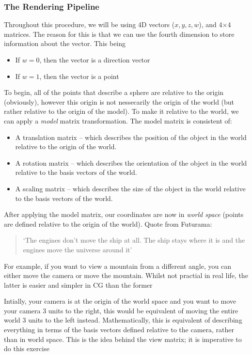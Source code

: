 \documentclass[main.tex]{subfiles}
\begin{document}
\subsubsection*{The Rendering Pipeline}
Throughout this procedure, we will be using 4D vectors ($x, y, z, w$), and 4$\times$4 matrices. The reason for this is that we can use the fourth dimension to store information
about the vector. This being
\begin{itemize}
    \item If $w = 0$, then the vector is a direction vector
    \item If $w = 1$, then the vector is a point
\end{itemize}
To begin, all of the points that describe a sphere are relative to the origin (obviously), however this origin is not nessecarily the origin
of the world (but rather relative to the origin of the model). To make it relative to the world, we can apply a \textit{model} matrix transformation.
The model matrix is consistent of:
\begin{itemize}
    \item A translation matrix -- which describes the position of the object in the world relative to the origin of the world.
    \item A rotation matrix -- which describes the orientation of the object in the world relative to the basis vectors of the world.
    \item A scaling matrix -- which describes the size of the object in the world relative to the basis vectors of the world.
\end{itemize}
After applying the model matrix, our coordinates are now in \textit{world space} (points are defined relative to the origin of the world).
Quote from Futurama:
\begin{quote}
    `The engines don't move the ship at all. The ship stays where it is and the engines move the universe around it'
\end{quote}
For example, if you want to view a mountain from a different angle, you can either move the camera or move the mountain.
Whilst not practial in real life, the latter is easier and simpler in CG than the former\@

Intially, your camera is at the origin of the world space and
you want to move your camera 3 units to the right, this would be equivalent of moving the entire world 3 units to the left instead.
Mathematically, this is equivalent of describing everything in terms of the basis vectors defined relative to the camera,
rather than in world space. This is the idea behind the view matrix; it is imperative to do this
exercise  
\end{document}
